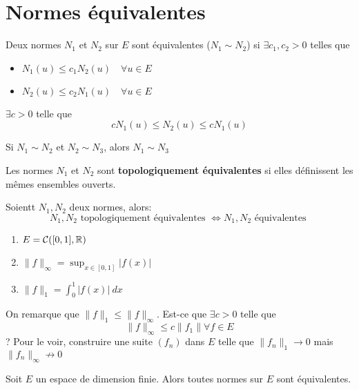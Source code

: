 \section{Normes équivalentes}
\begin{definition}
    Deux normes $N_1$ et  $N_2$ sur  $E$ sont équivalentes ($N_1 \sim N_2$) si $\exists c_1, c_2 > 0$ telles que 
    \begin{itemize}
        \item $N_1(u) \le c_1N_2(u) \quad \forall u \in E$
        \item $N_2(u) \le c_2N_1(u) \quad \forall u \in E$
    \end{itemize}
    $\exists c > 0$ telle que
    \[
    cN_1(u) \le N_2(u) \le cN_1(u)
    \] 
\end{definition}
\begin{remark}
   Si  $N_1 \sim N_2$ et $N_2 \sim N_3$, alors $N_1 \sim N_3$ 
\end{remark}
\begin{definition}
    Les normes $N_1$ et $N_2$ sont \textbf{topologiquement équivalentes} si elles définissent les mêmes ensembles ouverts.
\end{definition}
\begin{theorem}
    Soientt $N_1, N_2$ deux normes, alors:
    \[
    N_1, N_2 \text{ topologiquement équivalentes } \iff N_1, N_2 \text{ équivalentes }
    \] 
\end{theorem}
\begin{eg}
    \begin{enumerate}
        \item $E = \mathcal{C}([0, 1], \mathbb{R})$
        \item $\|f\|_{\infty} = \sup_{x \in [0, 1]}|f(x)|$
        \item $\|f\|_1 = \int_{{0}}^{{1}} {|f(x)|} \: d{x}$
    \end{enumerate}
    On remarque que $\|f\|_1 \le \|f\|_{\infty}$. Est-ce que $\exists c > 0$ telle que 
    \[
    \|f\|_{\infty} \le c\|f_1\| \forall f \in E
    \] 
    ?
    Pour le voir, construire une suite $(f_n)$ dans  $E$ telle que  $\|f_n\|_1 \to 0$ mais $\|f_n\|_{\infty} \not\to 0$
\end{eg}
\begin{theorem}
    Soit $E$ un espace de dimension finie. Alors toutes normes sur  $E$ sont équivalentes.
\end{theorem}

